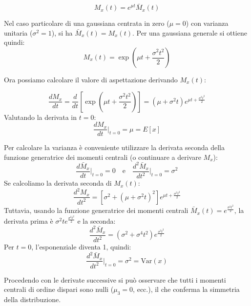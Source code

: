 \documentclass[openany,a4paper,12pt]{book}
\theoremstyle{remark}
\begin{document}
\begin{equation}
M_x(t) = e^{\mu t} \bar{M}_x(t)
\end{equation}

Nel caso particolare di una gaussiana centrata in zero ($\mu=0$) con varianza unitaria ($\sigma^2=1$), si ha $\bar{M}_x(t)=M_x(t)$.
Per una gaussiana generale si ottiene quindi:
\begin{equation} \boxed{
M_x(t) = \exp\left(\mu t + \frac{\sigma^2 t^2}{2}\right)}
\end{equation}

Ora possiamo calcolare il valore di aspettazione derivando $M_x(t)$:

\begin{equation}
\frac{d M_x}{dt} = \frac{d}{dt} \left[ \exp\left( \mu t + \frac{\sigma^2 t^2}{2} \right) \right] = \left( \mu + \sigma^2 t \right) e^{\mu t + \frac{\sigma^2 t^2}{2}}
\end{equation}
Valutando la derivata in $t = 0$:
\begin{equation}
\frac{d M_x}{dt} \bigg\rvert_{t=0} = \mu = E[x] 
\end{equation}

Per calcolare la varianza è conveniente utilizzare la derivata seconda della funzione generatrice dei momenti centrali (o continuare a derivare $M_x$):
\begin{equation}
\frac{d \bar{M}_x}{dt} \bigg\rvert_{t=0} = 0 \quad \text{e} \quad \frac{d^2 \bar{M}_x}{dt^2} \bigg\rvert_{t=0} = \sigma^2
\end{equation}
Se calcoliamo la derivata seconda di $M_x(t)$:
\begin{equation}
\frac{d^2 M_x}{dt^2} = \left[ \sigma^2 + (\mu + \sigma^2 t)^2 \right] e^{\mu t + \frac{\sigma^2 t^2}{2}}
\end{equation}
Tuttavia, usando la funzione generatrice dei momenti centrali $\bar{M}_x(t) = e^{\frac{\sigma^2 t^2}{2}}$, la derivata prima è $\sigma^2 t e^{\frac{\sigma^2 t^2}{2}}$ e la seconda:
\begin{equation}
\frac{d^2 \bar{M}_x}{dt^2} = (\sigma^2 + \sigma^4 t^2) e^{\frac{\sigma^2 t^2}{2}}
\end{equation}
Per $t=0$, l'esponenziale diventa 1, quindi:
\begin{equation}
\frac{d^2 \bar{M}_x}{dt^2} \bigg\rvert_{t=0} = \sigma^2 = \text{Var}(x)
\end{equation}

Procedendo con le derivate successive si può osservare che tutti i momenti centrali di ordine dispari sono nulli ($\mu_3 = 0$, ecc.), il che conferma la simmetria della distribuzione.
\end{document}
